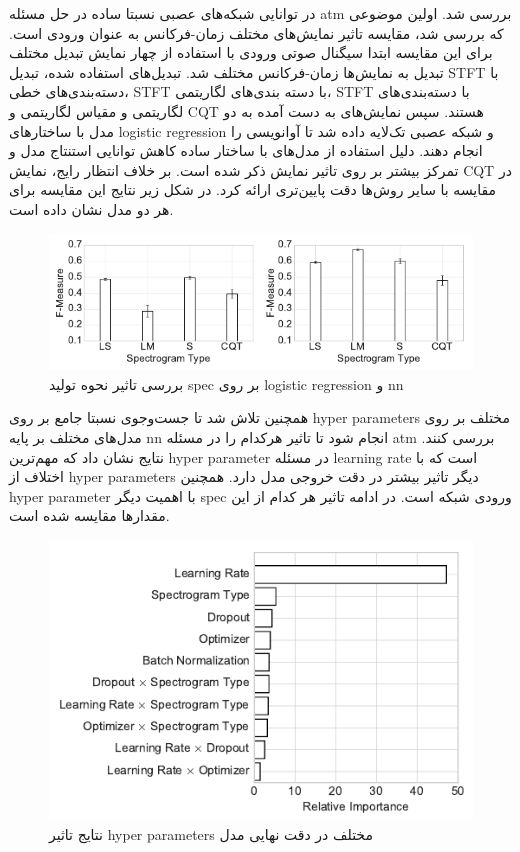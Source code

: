 در \cite{kelz2016potential} توانایی شبکه‌های عصبی نسبتا ساده در حل مسئله
\gls{atm} بررسی شد. اولین موضوعی که بررسی شد، مقایسه تاثیر نمایش‌های مختلف
زمان-فرکانس به عنوان ورودی است. برای این مقایسه ابتدا سیگنال صوتی ورودی با
استفاده از چهار نمایش تبدیل مختلف تبدیل به نمایش‌ها زمان-فرکانس مختلف شد.
تبدیل‌های استفاده شده، تبدیل \gls{STFT} با دسته‌بندی‌های خطی، \gls{STFT} با دسته
بندی‌های لگاریتمی، \gls{STFT} با دسته‌بندی‌های لگاریتمی و مقیاس لگاریتمی و
\gls{CQT} هستند. سپس نمایش‌های به دست آمده به دو مدل با ساختارهای \gls{logistic
regression} و شبکه عصبی تک‌لایه داده شد تا آوانویسی را انجام دهند. دلیل استفاده
از مدل‌های با ساختار ساده کاهش توانایی استنتاج مدل و تمرکز بیشتر بر روی تاثیر
نمایش ذکر شده است. بر خلاف انتظار رایج، نمایش \gls{CQT} در مقایسه با سایر روش‌ها
دقت پایین‌تری ارائه کرد. در شکل زیر نتایج این مقایسه برای هر دو مدل نشان داده است.
\begin{figure}[ht]
    \centering
    \includegraphics[width=12cm]{./statics/kelz2016potential_spec.png}
    \caption{بررسی تاثیر نحوه تولید \gls{spec} بر روی \gls{logistic regression} و \gls{nn}}
\end{figure}

همچنین تلاش شد تا جست‌وجوی نسبتا جامع بر روی \glspl{hyper parameter} مختلف بر
روی مدل‌های مختلف بر پایه \gls{nn} انجام شود تا تاثیر هرکدام را در مسئله
\gls{atm} بررسی کنند. نتایج نشان داد که مهم‌ترین \gls{hyper parameter} در مسئله
\gls{learning rate} است که با اختلاف از \glspl{hyper parameter} دیگر تاثیر بیشتر
در دقت خروجی مدل دارد. همچنین \gls{hyper parameter} با اهمیت دیگر \gls{spec}
ورودی شبکه است. در ادامه تاثیر هر کدام از این مقدارها مقایسه شده است.
\begin{figure}[ht]
    \centering
    \includegraphics[width=12cm]{./statics/kelz2016potential_hp.png}
    \caption{نتایج تاثیر \glspl{hyper parameter} مختلف در دقت نهایی مدل}
\end{figure}

